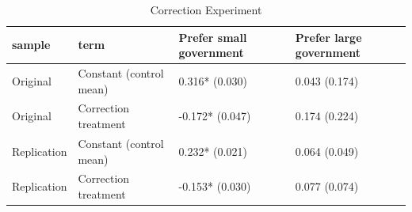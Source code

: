 \begin{table}[!h]
\centering
\caption{\label{tab:correction}Correction Experiment}
\centering
\begin{tabular}[t]{llll}
\toprule
sample & term & Prefer small government & Prefer large government\\
\midrule
Original & Constant (control mean) & 0.316*
(0.030) & 0.043
(0.174)\\
Original & Correction treatment & -0.172*
(0.047) & 0.174
(0.224)\\
Replication & Constant (control mean) & 0.232*
(0.021) & 0.064
(0.049)\\
Replication & Correction treatment & -0.153*
(0.030) & 0.077
(0.074)\\
\bottomrule
\end{tabular}
\end{table}
